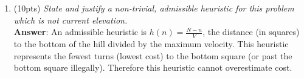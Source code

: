 \documentclass[fleqn]{hermans-hw}
\begin{document}
\begin{enumerate}
\item(10pts) \textit{State and justify a non-trivial, admissible heuristic for this
problem which is \emph{not} current elevation.}\\
\textbf{Answer}: An admissible heuristic is $ h(n) = \frac{N-n}{V} $, the distance (in squares) to the bottom of the hill divided by the maximum velocity. This heuristic represents the fewest turns (lowest cost) to the bottom square (or past the bottom square illegally).  Therefore this heuristic cannot overestimate cost.
\end{enumerate}

\begin{comment}
\section{Submission Instructions}

\begin{enumerate}

\item For the final submission you would be turning in a \textbf{PDF} document containing all your answers. No other submission format would be accepted. Please have your name written on top of the document. Replace the author name with your name and uID.

\item If you collaborated with a friend or classmate in doing the HW, please specify their names on the top of this document too. We hate the discussion about cheating and so please save all of us the trouble and cite appropriate sources/names.

\item Please ensure all the submissions are done through canvas. Please do not email the instructor or the TA with your submission. Submissions made via email would not be considered for grading.

\item \textbf{Naming: }Your final upload should be named in the format $<uid>$-HW1.pdf where $<uid>$ is your Utah uid. \textbf{Ex:} u0006300-HW1.pdf

\end{enumerate}
\end{comment}
\end{document}
